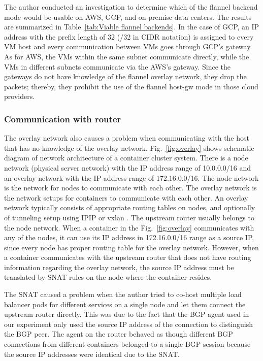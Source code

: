 The author conducted an investigation to determine which of the flannel backend mode would be usable on AWS, GCP, and on-premise data centers.
The results are summarized in Table~\ref{tab:Viable flannel backends}. 
In the case of GCP, an IP address with the prefix length of 32 (/32 in CIDR notation) is assigned to every VM host and every communication between VMs goes through GCP's gateway.
As for AWS, the VMs within the same subnet communicate directly, while the VMs in different subnets communicate via the AWS's gateway.
Since the gateways do not have knowledge of the flannel overlay network, they drop the packets; thereby, 
they prohibit the use of the flannel host-gw mode in those cloud providers.  

\subsubsection{Communication with router}

The overlay network also causes a problem when communicating with the host that has no knowledge of the overlay network.
Fig.~\ref{fig:overlay} shows schematic diagram of network architecture of a container cluster system. 
There is a node network (physical server network) with the IP address range of 10.0.0.0/16 and an overlay network with the IP address range of 172.16.0.0/16.
The node network is the network for nodes to communicate with each other.
The overlay network is the network setups for containers to communicate with each other.
An overlay network typically consists of appropriate routing tables on nodes, and optionally of tunneling setup using IPIP \cite{kuznetsov1999tunnels} or vxlan \cite{zismer2016performance}.
The upstream router usually belongs to the node network.
When a container in the Fig.~\ref{fig:overlay} communicates with any of the nodes, it can use its IP address in 172.16.0.0/16 range as a source IP, since every node has proper routing table for the overlay network.
However, when a container communicates with the upstream router that does not have routing information regarding the overlay network, the source IP address must be translated by SNAT rules on the node where the container resides.

The SNAT caused a problem when the author tried to co-host multiple load balancer pods for different services on a single node and let them connect the upstream router directly.
This was due to the fact that the BGP agent used in our experiment only used the source IP address of the connection to distinguish the BGP peer.
The agent on the router behaved as though different BGP connections from different containers belonged to a single BGP session because the source IP addresses were identical due to the SNAT.

